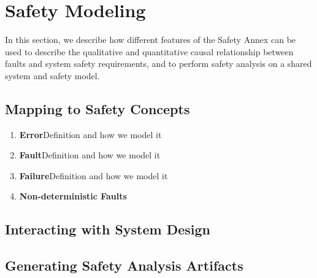\section{Safety Modeling}
\label{sec:safety_modeling}

In this section, we describe how different features of the Safety Annex can be used to describe the qualitative and quantitative causal relationship between faults and system safety requirements, and to perform safety analysis on a shared system and safety model.

\subsection{Mapping to Safety Concepts}

\begin{enumerate}
	\item \textbf{Error}Definition and how we model it
	\item \textbf{Fault}Definition and how we model it
	\item \textbf{Failure}Definition and how we model it
	\item \textbf{Non-deterministic Faults}
\end{enumerate}

\begin{comment}
Errors/Faults/Failures - to a safety engineer, these terms have very specific meanings.  You will see my specific comments on this topic where I located them by your Section 3.3.  If needed, we can talk about this comment after I send you my mark-ups.
In Section 3.1, you introduce the term "non-deterministic".  I am not sure how your new process can be used by the safety engineering discipline unless things are "deterministic" and therefore "repeatable".
\end{comment}

\subsection{Interacting with System Design}

\begin{comment}
This paper should define how your team of authors see the interaction between "functions" and "system".  
Here is how I see the interaction / relationship:
(a) Aircraft Functions are the highest level
(b) Aircraft Functions are comprised of one or more System
(c) Each System performs one or more System Function
(d) Each System is comprised of one or more LRUs (a.k.a. "items")
\end{comment}

\subsection{Generating Safety Analysis Artifacts}